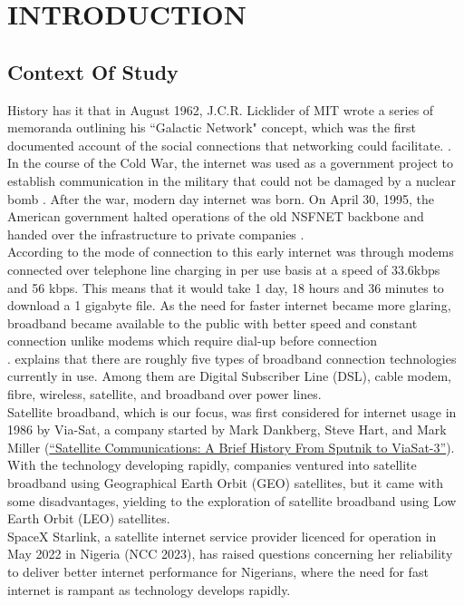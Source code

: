 \chapter{INTRODUCTION}
\section{Context Of Study}
History has it that in August 1962, J.C.R. Licklider of MIT wrote a series of memoranda outlining his ``Galactic Network" concept, which was the first documented account of the social connections that networking could facilitate. \cite{leinerbrief}. In the course of the Cold War, the internet was used as a government project to establish communication in the military that could not be damaged by a nuclear bomb \cite{abbate2000inventing}. After the war, modern day internet was born. On April 30, 1995, the American government halted operations of the old NSFNET backbone and handed over the infrastructure to private companies \cite{abbate2000inventing}.\\
	According to \cite{mack2020history} the mode of connection to this early internet was through modems connected over telephone line charging in per use basis at a speed of 33.6kbps and 56 kbps. This means that it would take 1 day, 18 hours and 36 minutes to download a 1 gigabyte file. As the need for faster internet became more glaring, broadband became available to the public with better speed and constant connection unlike modems which require dial-up before connection\\.
	\cite{moeyaert2011network} explains that there are roughly five types of broadband connection technologies currently in use. Among them are Digital Subscriber Line (DSL), cable modem, fibre, wireless, satellite, and broadband over power lines.\\
	Satellite broadband, which is our focus, was first considered for internet usage in 1986 by Via-Sat, a company started by Mark Dankberg, Steve Hart, and Mark Miller (\href{https://news.viasat.com/blog/scn/satellite-communications-a-brief-history-from-sputnik-to-viasat-3}{``Satellite Communications: A Brief History From Sputnik to ViaSat-3''}). With the technology developing rapidly, companies ventured into satellite broadband using Geographical Earth Orbit (GEO) satellites, but it came with some disadvantages, yielding to the exploration of satellite broadband using Low Earth Orbit (LEO) satellites.\\
	SpaceX Starlink, a satellite internet service provider licenced for operation in May 2022 in Nigeria (NCC 2023), has raised questions concerning her reliability to deliver better internet performance for Nigerians, where the need for fast internet is rampant as technology develops rapidly.
